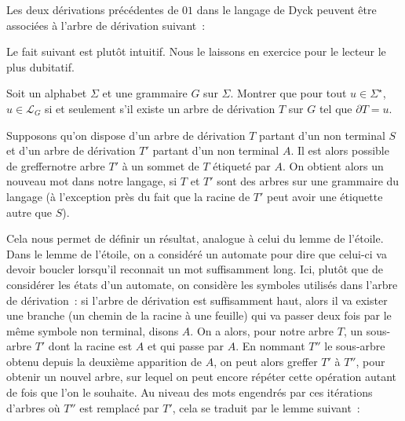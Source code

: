 \begin{example}
  Les deux dérivations précédentes de $01$ dans le langage de Dyck peuvent être
  associées à l'arbre de dérivation suivant~:
  \begin{figure}[h]
  \centering
\end{figure}
\end{example}

Le fait suivant est plutôt intuitif. Nous le laissons en exercice pour le
lecteur le plus dubitatif.

\begin{exercise}
  Soit un alphabet $\Sigma$ et une grammaire $G$ sur $\Sigma$. Montrer que
  pour tout $u \in \Sigma^\star$, $u \in \mathcal L_G$ si et seulement s'il
  existe un arbre de dérivation $T$ sur $G$ tel que $\partial T = u$.
\end{exercise}

Supposons qu'on dispose d'un arbre de dérivation $T$ partant d'un non terminal
$S$ et d'un arbre de dérivation $T'$ partant d'un non terminal $A$. Il est alors
possible de \og greffer\fg notre arbre $T'$ à un sommet de $T$ étiqueté par $A$.
On obtient alors un nouveau mot dans notre langage, si $T$ et $T'$ sont des
arbres sur une grammaire du langage (à l'exception près du fait que la racine
de $T'$ peut avoir une étiquette autre que $S$).

Cela nous permet de définir un résultat, analogue à celui du lemme de l'étoile.
Dans le lemme de l'étoile, on a considéré un automate pour dire que celui-ci va
devoir boucler lorsqu'il reconnait un mot suffisamment long. Ici, plutôt que de
considérer les états d'un automate, on considère les symboles utilisés dans
l'arbre de dérivation~: si l'arbre de dérivation est suffisamment haut, alors
il va exister une branche (un chemin de la racine à une feuille) qui va passer
deux fois par le même symbole non terminal, disons $A$. On a alors, pour notre
arbre $T$, un sous-arbre $T'$ dont la racine est $A$ et qui passe par $A$. En
nommant $T''$ le sous-arbre obtenu depuis la deuxième apparition de $A$, on peut
alors greffer $T'$ à $T''$, pour obtenir un nouvel arbre, sur lequel on peut
encore répéter cette opération autant de fois que l'on le souhaite. Au niveau
des mots engendrés par ces itérations d'arbres où $T''$ est remplacé par $T'$,
cela se traduit par le lemme suivant~:

